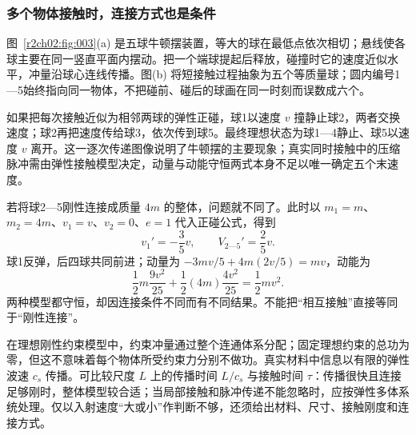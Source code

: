 \subsubsection{多个物体接触时，连接方式也是条件}
\label{r2ch02:sec:multiple-collision}
图~\ref{r2ch02:fig:003}(a) 是五球牛顿摆装置，等大的球在最低点依次相切；悬线使各球主要在同一竖直平面内摆动。把一个端球提起后释放，碰撞时它的速度近似水平，冲量沿球心连线传播。图(b) 将短接触过程抽象为五个等质量球；圆内编号1—5始终指向同一物体，不把碰前、碰后的球画在同一时刻而误数成六个。
\figNewtonCradle

如果把每次接触近似为相邻两球的弹性正碰，球1以速度 $v$ 撞静止球2，两者交换速度；球2再把速度传给球3，依次传到球5。最终理想状态为球1—4静止、球5以速度 $v$ 离开。这一逐次传递图像说明了牛顿摆的主要现象；真实同时接触中的压缩脉冲需由弹性接触模型决定，动量与动能守恒两式本身不足以唯一确定五个末速度。

若将球2—5刚性连接成质量 $4m$ 的整体，问题就不同了。此时以 $m_1=m$、$m_2=4m$、$v_1=v$、$v_2=0$、$e=1$ 代入正碰公式，得到
\[
 v_1'=-\frac35v,\qquad V_{2\text{—}5}'=\frac25v.
\]
球1反弹，后四球共同前进；动量为 $-3mv/5+4m(2v/5)=mv$，动能为
\[
 \frac12m\frac{9v^2}{25}+\frac12(4m)\frac{4v^2}{25}
 =\frac12mv^2.
\]
两种模型都守恒，却因连接条件不同而有不同结果。不能把“相互接触”直接等同于“刚性连接”。

在理想刚性约束模型中，约束冲量通过整个连通体系分配；固定理想约束的总功为零，但这不意味着每个物体所受约束力分别不做功。真实材料中信息以有限的弹性波速 $c_s$ 传播。可比较尺度 $L$ 上的传播时间 $L/c_s$ 与接触时间 $\tau$：传播很快且连接足够刚时，整体模型较合适；当局部接触和脉冲传递不能忽略时，应按弹性多体系统处理。仅以入射速度“大或小”作判断不够，还须给出材料、尺寸、接触刚度和连接方式。
